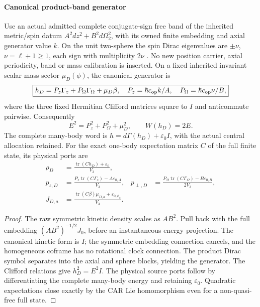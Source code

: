 \documentclass[12pt,a4paper]{article}
\begin{document}
\paragraph{Canonical product-band generator}
\begin{proposition}
\label{p4:prop:spherical-free-dirac-source}
Use an actual admitted complete conjugate-sign free band of the inherited
metric/spin datum
\(A^2dz^2+B^2d\Omega_2^2\), with its owned finite embedding and axial
generator value \(k\). On the unit two-sphere the spin Dirac eigenvalues
are \(\pm\nu\), \(\nu=\ell+1\geq1\), each sign with multiplicity
\(2\nu\) \cite{BaerSphereDiracSpectrum}. No new position carrier, axial
periodicity, band or mass calibration is inserted.
On a fixed inherited invariant scalar mass sector \(\mu_D(\phi)\), the
canonical generator is
\begin{equation}
 \boxed{h_D=P_z\Gamma_z+P_\Omega\Gamma_\Omega+\mu_D\beta,
 \quad P_z=\hbar c_{\rm op}k/A,\quad
 P_\Omega=\hbar c_{\rm op}\nu/B,}
 \label{p4:eq:spherical-free-dirac-generator}
\end{equation}
where the three fixed Hermitian Clifford matrices square to \(I\) and
anticommute pairwise. Consequently
\begin{equation}
 \boxed{E^2=P_z^2+P_\Omega^2+\mu_D^2,\qquad W(h_D)=2E.}
 \label{p4:eq:spherical-free-dirac-width}
\end{equation}
The complete many-body word is \(h=d\Gamma(h_D)+\varepsilon_0I\), with
the actual central allocation retained. For the exact one-body expectation
matrix \(C\) of the full finite state, its physical ports are
\begin{align}
 \rho_D&=\frac{\operatorname{tr}(Ch_D)+\varepsilon_0}{V_3},\nonumber\\
 p_{z,D}&=\frac{P_z\operatorname{tr}(C\Gamma_z)-A\varepsilon_{0,A}}{V_3},
 &p_{\perp,D}&=\frac{P_\Omega\operatorname{tr}(C\Gamma_\Omega)
 -B\varepsilon_{0,B}}{2V_3},\nonumber\\
 J_{D,a}&=\frac{\operatorname{tr}(C\beta)\mu_{D,a}
 +\varepsilon_{0,\phi_a}}{V_3}.
 \label{p4:eq:spherical-free-dirac-ports}
\end{align}
\end{proposition}
\begin{proof}
The raw symmetric kinetic density scales as \(AB^2\). Pull back with the
full embedding \((AB^2)^{-1/2}J_0\), before an instantaneous energy
projection. The canonical kinetic form is \(I\); the symmetric embedding
connection cancels, and the homogeneous coframe has no rotational clock
connection. The product Dirac symbol separates into the axial and sphere
blocks, yielding the generator. The Clifford relations give \(h_D^2=E^2I\).
The physical source ports follow by differentiating the complete many-body
energy and retaining \(\varepsilon_0\). Quadratic expectations close
exactly by the CAR Lie homomorphism even for a non-quasi-free full state.
\end{proof}
\end{document}
